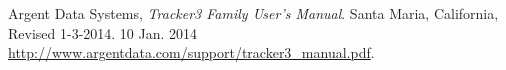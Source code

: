 \begin{thebibliography}{99}


		Argent Data Systems,
		\emph{Tracker3 Family User's Manual}.
		Santa Maria, California,
		Revised 1-3-2014.
		10 Jan. 2014 
		\url{http://www.argentdata.com/support/tracker3_manual.pdf}.

\end{thebibliography}

